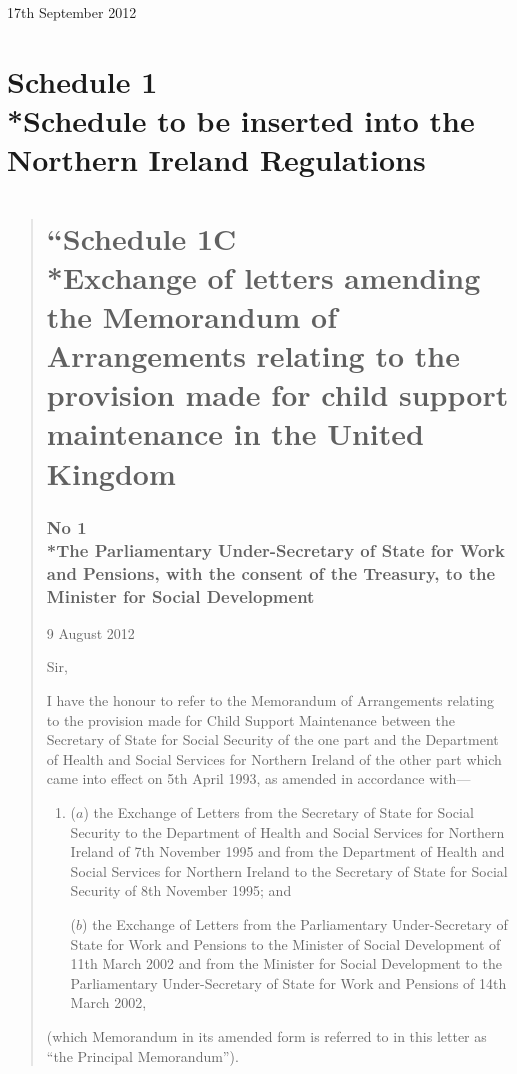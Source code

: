 \documentclass[12pt,a4paper]{article}
\begin{document}
17th September 2012

\small\vfill\pagebreak

\renewcommand\parthead{--- Schedule 1}

\part[Schedule 1 --- Schedule to be inserted into the Northern Ireland Regulations]{Schedule 1\\*Schedule to be inserted into the Northern Ireland Regulations}

\begin{quotation}
\noindent
\part*{``Schedule 1C\\*Exchange of letters amending the Memorandum of Arrangements relating to the provision made for child support maintenance in the United Kingdom}

\section*{No 1\\*The Parliamentary Under-Secretary of State for Work and Pensions, with the consent of the Treasury, to the Minister for Social Development}

9 August 2012

Sir,

I have the honour to refer to the Memorandum of Arrangements relating to the 
provision made for Child Support Maintenance between the Secretary of State for
Social Security of the one part and the Department of Health and Social Services for
Northern Ireland of the other part which came into effect on 5th April 1993, as
amended in accordance with---
\begin{enumerate}\item[]
($a$) the Exchange of Letters from the Secretary of State for Social Security to the Department of Health and Social Services for Northern Ireland of 7th November 1995 and from the Department of Health and Social Services for Northern Ireland to the Secretary of State for Social Security of 8th November 1995; and

($b$) the Exchange of Letters from the Parliamentary Under-Secretary of State for Work and Pensions to the Minister of Social Development of 11th March 2002 and from the Minister for Social Development to the Parliamentary Under-Secretary of State for Work and Pensions of 14th March 2002,
\end{enumerate}
(which Memorandum in its amended form is referred to in this letter as ``the Principal Memorandum'').


\end{quotation}
\end{document}
